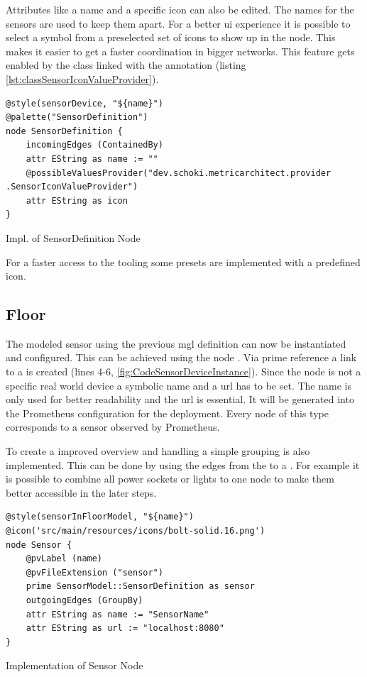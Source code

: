 Attributes like a name and a specific icon  can also be edited. The names for the sensors are used to keep them apart. For a better \gls{ui} experience it is possible to select a symbol from a preselected set of icons to show up in the node. This makes it easier to get a faster coordination in bigger networks. This feature gets enabled by the  class linked with the  annotation (listing \ref{lst:classSensorIconValueProvider}).
\begin{listing}[H]
	\begin{verbatim}
@style(sensorDevice, "${name}")
@palette("SensorDefinition")
node SensorDefinition {
	incomingEdges (ContainedBy)
	attr EString as name := ""
	@possibleValuesProvider("dev.schoki.metricarchitect.provider .SensorIconValueProvider")
	attr EString as icon
}		
	\end{verbatim}
	\caption{Impl. of SensorDefinition Node}
	\label{fig:CodeSensorDevice}
\end{listing}
For a faster access to the tooling some presets are implemented with a predefined icon.
\subsection{Floor}
The modeled sensor using the previous \gls{mgl} definition can now be instantiated and configured. This can be achieved using the node . Via prime reference a link to a  is created (lines 4-6, \ref{fig:CodeSensorDeviceInstance}). Since the  node is not a specific real world device a symbolic name and a \gls{url} has to be set. The name is only used for better readability and the \gls{url} is essential. It will be generated into the Prometheus configuration for the deployment. Every node of this type corresponds to a sensor observed by Prometheus. 

To create a improved overview and handling a simple grouping is also implemented. This can be done by using the  edges from the  to a . For example it is possible to combine all power sockets or lights to one node to make them better accessible in the later steps. 

\begin{listing}[H]
	\begin{verbatim}
@style(sensorInFloorModel, "${name}")
@icon('src/main/resources/icons/bolt-solid.16.png')
node Sensor {
	@pvLabel (name)
	@pvFileExtension ("sensor")
	prime SensorModel::SensorDefinition as sensor
	outgoingEdges (GroupBy)
	attr EString as name := "SensorName"
	attr EString as url := "localhost:8080"
}	
	\end{verbatim}
	\caption{Implementation of Sensor Node}
	\label{fig:CodeSensorDeviceInstance}
\end{listing}

